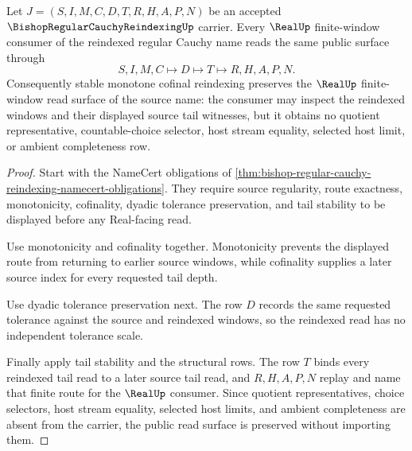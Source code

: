 \begin{theorem}
\label{thm:bishop-regular-cauchy-reindexing-tail-stability}
Let $J=(S,I,M,C,D,T,R,H,A,P,N)$ be an accepted $\BishopRegularCauchyReindexingUp$ carrier. Every $\RealUp$ finite-window consumer of the reindexed regular Cauchy name reads the same public surface through
$$
S,I,M,C \longmapsto D \longmapsto T \longmapsto R,H,A,P,N .
$$
Consequently stable monotone cofinal reindexing preserves the $\RealUp$ finite-window read surface of the source name: the consumer may inspect the reindexed windows and their displayed source tail witnesses, but it obtains no quotient representative, countable-choice selector, host stream equality, selected host limit, or ambient completeness row.
\end{theorem}
\begin{proof}
Start with the NameCert obligations of \autoref{thm:bishop-regular-cauchy-reindexing-namecert-obligations}. They require source regularity, route exactness, monotonicity, cofinality, dyadic tolerance preservation, and tail stability to be displayed before any Real-facing read.

Use monotonicity and cofinality together. Monotonicity prevents the displayed route from returning to earlier source windows, while cofinality supplies a later source index for every requested tail depth.

Use dyadic tolerance preservation next. The row $D$ records the same requested tolerance against the source and reindexed windows, so the reindexed read has no independent tolerance scale.

Finally apply tail stability and the structural rows. The row $T$ binds every reindexed tail read to a later source tail read, and $R,H,A,P,N$ replay and name that finite route for the $\RealUp$ consumer. Since quotient representatives, choice selectors, host stream equality, selected host limits, and ambient completeness are absent from the carrier, the public read surface is preserved without importing them.
\end{proof}



